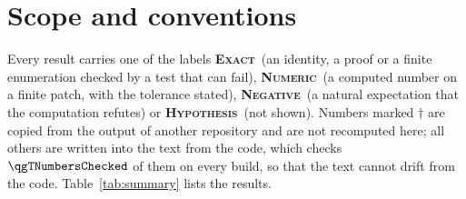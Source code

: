 \documentclass[11pt]{article}
\newcommand{\exact}{\textbf{\textsc{Exact}}}
\newcommand{\numeric}{\textbf{\textsc{Numeric}}}
\newcommand{\hypo}{\textbf{\textsc{Hypothesis}}}
\newcommand{\negres}{\textbf{\textsc{Negative}}}
\theoremstyle{definition}
\begin{document}
\section{Scope and conventions}\label{sec:scope}
Every result carries one of the labels \exact\ (an identity, a proof or a finite enumeration checked by a test that can fail), \numeric\ (a computed number on a finite patch, with the tolerance stated), \negres\ (a natural expectation that the computation refutes) or \hypo\ (not shown). Numbers marked $\dagger$ are copied from the output of another repository and are not recomputed here; all others are written into the text from the code, which checks $\qgTNumbersChecked$ of them on every build, so that the text cannot drift from the code. Table~\ref{tab:summary} lists the results.
\end{document}
